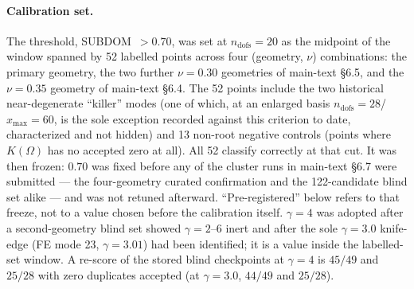 \documentclass[11pt]{article}
\begin{document}
\paragraph{Calibration set.} The threshold, SUBDOM~$>0.70$, was set at
$n_{\mathrm{dofs}}=20$ as the midpoint of the window spanned by 52
labelled points across four
(geometry, $\nu$) combinations: the primary geometry, the two further
$\nu=0.30$ geometries of main-text \S6.5, and the $\nu=0.35$ geometry of
main-text \S6.4. The 52 points
include the two historical near-degenerate ``killer'' modes (one of
which, at an enlarged basis $n_{\mathrm{dofs}}=28$/$x_{\max}=60$, is the
sole exception recorded against this criterion to date, characterized and
not hidden) and 13 non-root negative controls (points where $K(\Omega)$
has no accepted zero at all). All 52 classify correctly at that
cut. It was then frozen: $0.70$ was fixed before any of the cluster runs
in main-text \S6.7 were submitted --- the four-geometry curated
confirmation and the 122-candidate blind set alike --- and was not
retuned afterward. ``Pre-registered'' below refers to that freeze, not to
a value chosen before the calibration itself. $\gamma=4$ was adopted after a second-geometry blind set showed
$\gamma=2$--$6$ inert and after the sole $\gamma=3.0$ knife-edge (FE mode 23,
$\gamma=3.01$) had been identified; it is a value inside the labelled-set
window. A re-score of the stored blind
checkpoints at $\gamma=4$ is $45/49$ and $25/28$ with zero duplicates
accepted (at $\gamma=3.0$, $44/49$ and $25/28$).
\end{document}
